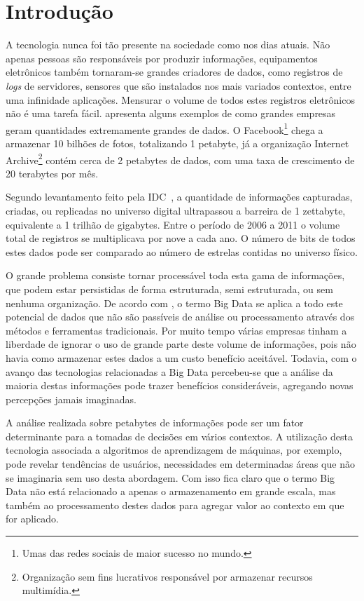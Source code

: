 \chapter{Introdução}
 
A tecnologia nunca foi tão presente na sociedade como nos dias atuais. Não apenas pessoas são responsáveis por produzir informações, equipamentos eletrônicos também tornaram-se grandes criadores de dados, como registros de \textit{logs} de servidores, sensores que são instalados nos mais variados contextos, entre uma infinidade aplicações. Mensurar o volume de todos estes registros eletrônicos não é uma tarefa fácil.  apresenta alguns exemplos de como grandes empresas geram quantidades extremamente grandes de dados. O Facebook\footnote{Umas das redes sociais de maior sucesso no mundo.} chega a armazenar 10 bilhões de fotos, totalizando 1 petabyte, já a organização Internet Archive\footnote{Organização sem fins lucrativos responsável por armazenar recursos multimídia.} contém cerca de 2 petabytes de dados, com uma taxa de crescimento de 20 terabytes por mês.

Segundo levantamento feito pela IDC~\cite{gantz2011}, a quantidade de informações capturadas, criadas, ou replicadas no universo digital ultrapassou a barreira de 1 zettabyte, equivalente a 1 trilhão de gigabytes. Entre o período de 2006 a 2011 o volume total de registros se multiplicava por nove a cada ano. O número de bits de todos estes dados pode ser comparado ao número de estrelas contidas no universo físico.

O grande problema consiste tornar processável toda esta gama de informações, que podem estar persistidas de forma estruturada, semi estruturada, ou sem nenhuma organização. De acordo com , o termo Big Data se aplica a todo este potencial de dados que não são passíveis de análise ou processamento através dos métodos e ferramentas tradicionais. Por muito tempo várias empresas tinham a liberdade de ignorar o uso de grande parte deste volume de informações, pois não havia como armazenar estes dados a um custo benefício aceitável. Todavia, com o avanço das tecnologias relacionadas a Big Data percebeu-se que a análise da maioria destas informações pode trazer benefícios consideráveis, agregando novas percepções jamais imaginadas.

A análise realizada sobre petabytes de informações pode ser um fator determinante para a tomadas de decisões em vários contextos. A utilização desta tecnologia associada a algoritmos de aprendizagem de máquinas, por exemplo, pode revelar tendências de usuários, necessidades em determinadas áreas que não se imaginaria sem uso desta abordagem. Com isso fica claro que o termo Big Data não está relacionado a apenas o armazenamento em grande escala, mas também ao processamento destes dados para agregar valor ao contexto em que for aplicado.

